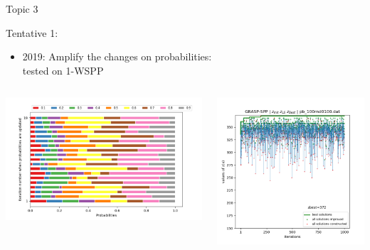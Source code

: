 \documentclass[10pt,xcolor=dvipsnames]{beamer}
\begin{document}
\begin{frame}{Topic 3}



Tentative 1:
\begin{itemize} 
\item 2019: Amplify the changes on probabilities: \\  tested on 1-WSPP
\end{itemize}
\begin{columns}
\begin{column}{0.575\textwidth}
\includegraphics[scale=0.35]{arunalpha2019.png}
\end{column}
\begin{column}{0.45\textwidth}
 \includegraphics[scale=0.3]{arunz2019.png}
\end{column}
\end{columns}

\vfill

\end{frame}
\end{document}
